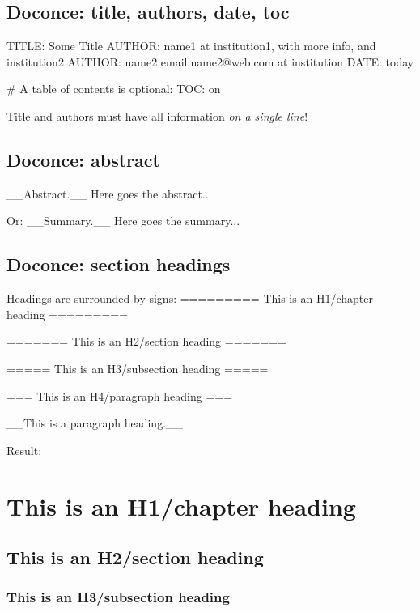 \documentclass[%
oneside,                 %
final,                   %
chapterprefix=true,      %
open=right               %
10pt]{book}
\newenvironment{graybox1admon}[1][]{
\begin{graybox1mdframed}[frametitle=#1]
}
{
\end{graybox1mdframed}
}
\begin{document}
\section{Doconce: title, authors, date, toc}

\bccq
TITLE: Some Title
AUTHOR: name1 at institution1, with more info, and institution2
AUTHOR: name2 email:name2@web.com at institution
DATE: today

# A table of contents is optional:
TOC: on
\eccq


\begin{graybox1admon}[Notice.]
Title and authors must have all information \emph{on a single line}!
\end{graybox1admon}

\section{Doconce: abstract}

\bccq
__Abstract.__
Here goes the abstract...
\eccq

Or:
\bccq
__Summary.__
Here goes the summary...
\eccq


\section{Doconce: section headings}

Headings are surrounded by \code{=} signs:
\bccq
========= This is an H1/chapter heading =========

======= This is an H2/section heading =======

===== This is an H3/subsection heading =====

=== This is an H4/paragraph heading ===

__This is a paragraph heading.__
\eccq

Result:

\chapter{This is an H1/chapter heading}

\section{This is an H2/section heading}

\subsection{This is an H3/subsection heading}
\end{document}
